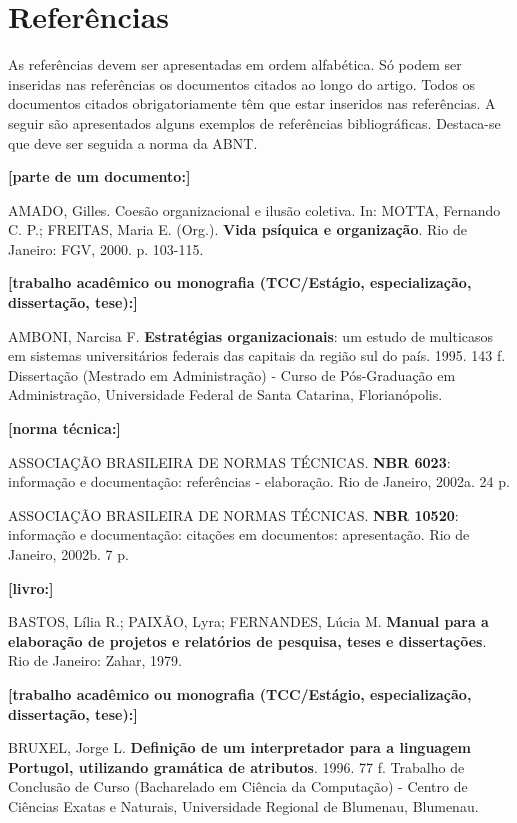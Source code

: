 \section*{Referências}

As referências devem ser apresentadas em ordem alfabética. Só podem ser
inseridas nas referências os documentos citados ao longo do artigo.
Todos os documentos citados obrigatoriamente têm que estar inseridos nas
referências. A seguir são apresentados alguns exemplos de referências
bibliográficas. Destaca-se que deve ser seguida a norma da ABNT.

\noindent\textbf{[parte de um documento:]}

AMADO, Gilles. Coesão organizacional e ilusão coletiva. In: MOTTA,
Fernando C. P.; FREITAS, Maria E. (Org.). \textbf{Vida psíquica e
organização}. Rio de Janeiro: FGV, 2000. p. 103-115.

\noindent\textbf{[trabalho acadêmico ou monografia (TCC/Estágio, especialização, dissertação, tese):]}

AMBONI, Narcisa F. \textbf{Estratégias organizacionais}: um estudo de
multicasos em sistemas universitários federais das capitais da região
sul do país. 1995. 143 f. Dissertação (Mestrado em Administração) -
Curso de Pós-Graduação em Administração, Universidade Federal de Santa
Catarina, Florianópolis.

\noindent\textbf{[norma técnica:]}

ASSOCIAÇÃO BRASILEIRA DE NORMAS TÉCNICAS. \textbf{NBR 6023}: informação
e documentação: referências - elaboração. Rio de Janeiro, 2002a. 24 p.

ASSOCIAÇÃO BRASILEIRA DE NORMAS TÉCNICAS. \textbf{NBR 10520}: informação
e documentação: citações em documentos: apresentação. Rio de Janeiro,
2002b. 7 p.

\noindent\textbf{[livro:]}

BASTOS, Lília R.; PAIXÃO, Lyra; FERNANDES, Lúcia M. \textbf{Manual para
a elaboração de projetos e relatórios de pesquisa, teses e
dissertações}. Rio de Janeiro: Zahar, 1979.

\noindent\textbf{[trabalho acadêmico ou monografia (TCC/Estágio, especialização, dissertação, tese):]}

BRUXEL, Jorge L. \textbf{Definição de um interpretador para a linguagem
Portugol, utilizando gramática de atributos}. 1996. 77 f. Trabalho de
Conclusão de Curso (Bacharelado em Ciência da Computação) - Centro de
Ciências Exatas e Naturais, Universidade Regional de Blumenau, Blumenau.

